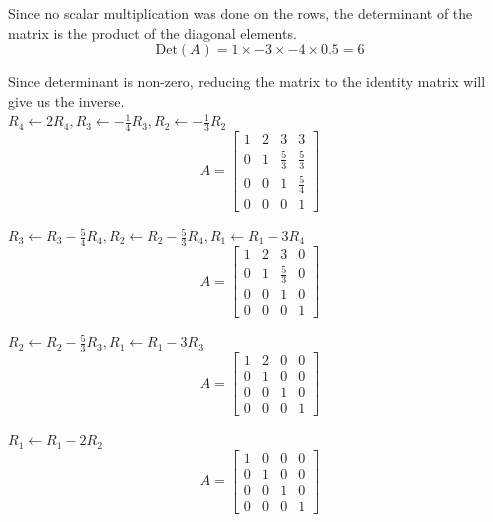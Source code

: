 \documentclass[a4paper]{article}
\begin{document}
\begin{enumerate}
\begin{enumerate}
            Since no scalar multiplication was done on the rows, the determinant of the matrix is the product of the diagonal elements.\\
            \[\text{Det}(A) = 1 \times -3 \times -4 \times 0.5 = 6\]

            Since determinant is non-zero, reducing the matrix to the identity matrix will give us the inverse.\\
            
            $R_4 \leftarrow 2R_4, R_3 \leftarrow -\frac{1}{4}R_3, R_2 \leftarrow -\frac{1}{3}R_2$\\
            \[A = \begin{bmatrix} 1 & 2 & 3 & 3 \\ 0 & 1 & \frac{5}{3} & \frac{5}{3} \\ 0 & 0 & 1 & \frac{5}{4} \\ 0 & 0 & 0 & 1 \end{bmatrix}\]

            $R_3 \leftarrow R_3 - \frac{5}{4}R_4, R_2 \leftarrow R_2 - \frac{5}{3}R_4, R_1 \leftarrow R_1 - 3R_4$\\
            \[A = \begin{bmatrix} 1 & 2 & 3 & 0 \\ 0 & 1 & \frac{5}{3} & 0 \\ 0 & 0 & 1 & 0 \\ 0 & 0 & 0 & 1 \end{bmatrix}\]

            $R_2 \leftarrow R_2 - \frac{5}{3}R_3, R_1 \leftarrow R_1 - 3R_3$\\
            \[A = \begin{bmatrix} 1 & 2 & 0 & 0 \\ 0 & 1 & 0 & 0 \\ 0 & 0 & 1 & 0 \\ 0 & 0 & 0 & 1 \end{bmatrix}\]

            $R_1 \leftarrow R_1 - 2R_2$\\
            \[A = \begin{bmatrix} 1 & 0 & 0 & 0 \\ 0 & 1 & 0 & 0 \\ 0 & 0 & 1 & 0 \\ 0 & 0 & 0 & 1 \end{bmatrix}\]
            

\end{enumerate}
\end{enumerate}
\end{document}
